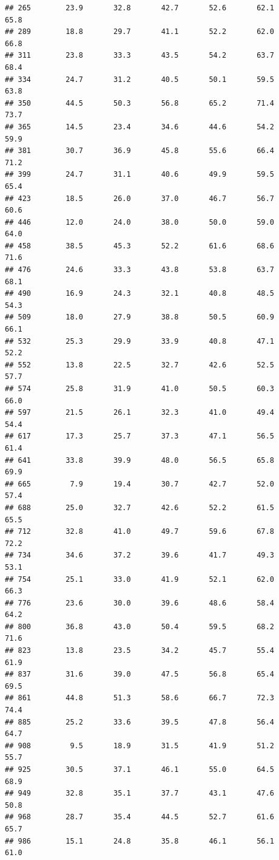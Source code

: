 \documentclass[
]{article}
\begin{document}
\begin{verbatim}
## 265        23.9       32.8       42.7       52.6       62.1       65.8
## 289        18.8       29.7       41.1       52.2       62.0       66.8
## 311        23.8       33.3       43.5       54.2       63.7       68.4
## 334        24.7       31.2       40.5       50.1       59.5       63.8
## 350        44.5       50.3       56.8       65.2       71.4       73.7
## 365        14.5       23.4       34.6       44.6       54.2       59.9
## 381        30.7       36.9       45.8       55.6       66.4       71.2
## 399        24.7       31.1       40.6       49.9       59.5       65.4
## 423        18.5       26.0       37.0       46.7       56.7       60.6
## 446        12.0       24.0       38.0       50.0       59.0       64.0
## 458        38.5       45.3       52.2       61.6       68.6       71.6
## 476        24.6       33.3       43.8       53.8       63.7       68.1
## 490        16.9       24.3       32.1       40.8       48.5       54.3
## 509        18.0       27.9       38.8       50.5       60.9       66.1
## 532        25.3       29.9       33.9       40.8       47.1       52.2
## 552        13.8       22.5       32.7       42.6       52.5       57.7
## 574        25.8       31.9       41.0       50.5       60.3       66.0
## 597        21.5       26.1       32.3       41.0       49.4       54.4
## 617        17.3       25.7       37.3       47.1       56.5       61.4
## 641        33.8       39.9       48.0       56.5       65.8       69.9
## 665         7.9       19.4       30.7       42.7       52.0       57.4
## 688        25.0       32.7       42.6       52.2       61.5       65.5
## 712        32.8       41.0       49.7       59.6       67.8       72.2
## 734        34.6       37.2       39.6       41.7       49.3       53.1
## 754        25.1       33.0       41.9       52.1       62.0       66.3
## 776        23.6       30.0       39.6       48.6       58.4       64.2
## 800        36.8       43.0       50.4       59.5       68.2       71.6
## 823        13.8       23.5       34.2       45.7       55.4       61.9
## 837        31.6       39.0       47.5       56.8       65.4       69.5
## 861        44.8       51.3       58.6       66.7       72.3       74.4
## 885        25.2       33.6       39.5       47.8       56.4       64.7
## 908         9.5       18.9       31.5       41.9       51.2       55.7
## 925        30.5       37.1       46.1       55.0       64.5       68.9
## 949        32.8       35.1       37.7       43.1       47.6       50.8
## 968        28.7       35.4       44.5       52.7       61.6       65.7
## 986        15.1       24.8       35.8       46.1       56.1       61.0

\end{verbatim}
\end{document}
